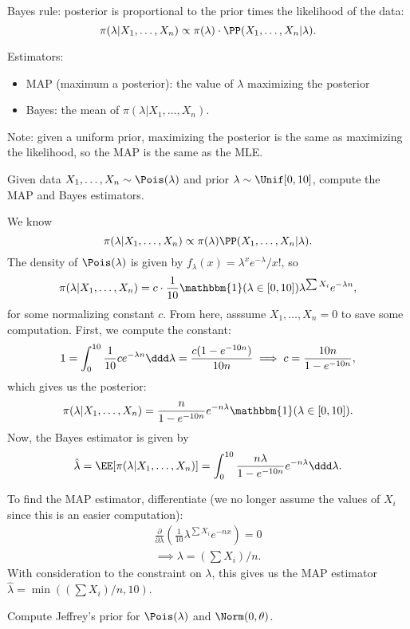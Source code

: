 Bayes rule: posterior is proportional to the prior times the likelihood of the data:
\[\pi(\lambda | X_1, \hdots, X_n) \propto \pi(\lambda)\cdot \PP(X_1, \hdots, X_n | \lambda).\]

Estimators:
\begin{itemize}
    \item MAP (maximum a posterior): the value of $\lambda$ maximizing the posterior
    \item Bayes: the mean of $\pi(\lambda | X_1, \hdots, X_n)$.
\end{itemize}

Note: given a uniform prior, maximizing the posterior is the same as maximizing the likelihood, so the MAP is the same as the MLE.

\begin{example}
\exlabel

Given data $X_1, \hdots, X_n\sim \Pois(\lambda)$ and prior $\lambda\sim \Unif[0,10]$, compute the MAP and Bayes estimators. 
\end{example}
We know 
\[\pi(\lambda|X_1, \hdots, X_n) \propto \pi(\lambda)\PP(X_1, \hdots, X_n|\lambda).\]
The density of $\Pois(\lambda)$ is given by $f_{\lambda}(x) = \lambda^xe^{-\lambda}/x!$, so 
\[\pi(\lambda|X_1, \hdots, X_n) = c\cdot \frac{1}{10}\mathbbm{1}(\lambda \in [0,10])\lambda^{\sum X_i}e^{-\lambda n},\]
for some normalizing constant $c$. From here, asssume $X_1, \hdots, X_n = 0$ to save some computation. First, we compute the constant:
\[1 = \int_{0}^{10}\frac{1}{10}ce^{-\lambda n}\ddd \lambda = \frac{c(1-e^{-10n})}{10n}\implies c = \frac{10n}{1-e^{-10n}},\]
which gives us the posterior: 
\[\pi(\lambda|X_1, \hdots, X_n) = \frac{n}{1-e^{-10n}}e^{-n\lambda}\mathbbm{1}(\lambda\in [0,10]).\]
Now, the Bayes estimator is given by 
\[\hat{\lambda} = \EE[\pi(\lambda|X_1, \hdots, X_n)] = \int_{0}^{10}\frac{n\lambda}{1-e^{-10n}}e^{-n\lambda}\ddd\lambda.\]

To find the MAP estimator, differentiate (we no longer assume the values of $X_i$ since this is an easier computation): 
\begin{align*}
    \frac{\partial}{\partial \lambda}\left(\frac{1}{10}\lambda^{\sum X_i}e^{-nx}\right) = 0\\
    \implies \lambda = \left(\sum X_i\right)/n.
\end{align*}
With consideration to the constraint on $\lambda$, this gives us the MAP estimator $\hat{\lambda} = \min((\sum X_i)/n, 10)$. 

\begin{example}
\exlabel

Compute Jeffrey's prior for $\Pois(\lambda)$ and $\Norm(0,\theta)$.
\end{example}

